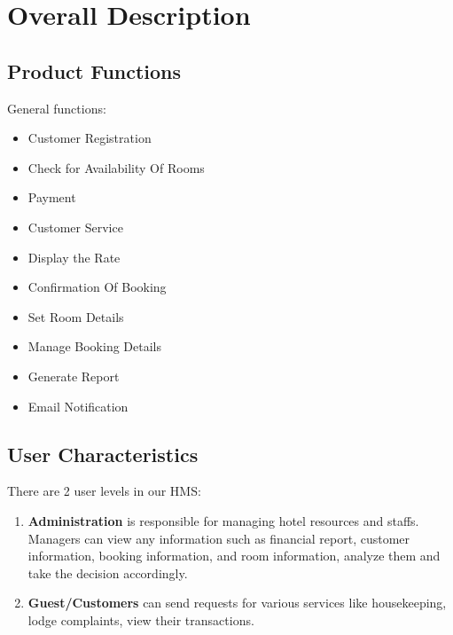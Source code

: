 \documentclass{scrreprt}
\begin{document}
\chapter{Overall Description}

\section{Product Functions}
General functions:
\begin{itemize}
\item Customer Registration
\item Check for Availability Of Rooms
\item Payment
\item Customer Service
\item Display the Rate
\item Confirmation Of Booking
\item Set Room Details
\item Manage Booking Details
\item Generate Report
\item Email Notification

\end{itemize}

\section{User Characteristics}

There are 2 user levels in our HMS:
\begin{enumerate}
\item \textbf{Administration} is responsible for managing hotel
resources and staffs. Managers can view any information such as financial report, customer information,
booking information, and room information, analyze them and take the decision accordingly.
\item \textbf{Guest/Customers} can send requests for various services like housekeeping, lodge complaints, view their transactions.
\end{enumerate}
\end{document}
